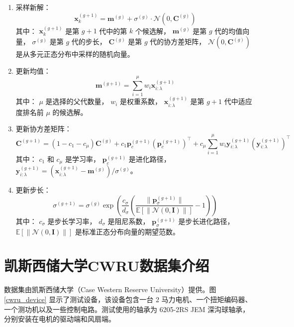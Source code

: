 \documentclass[master]{thesis-uestc}
\begin{document}
\begin{enumerate}[label={(\arabic*)}]
 \item 采样新解：
\begin{equation}
\mathbf{x}_k^{(g+1)} = \mathbf{m}^{(g)} + \sigma^{(g)} \cdot \mathcal{N}(0, \mathbf{C}^{(g)})
\label{eq:sample}
\end{equation}
其中：
    \(\mathbf{x}_k^{(g+1)}\) 是第 \(g+1\) 代中的第 \(k\) 个候选解，
    \(\mathbf{m}^{(g)}\) 是第 \(g\) 代的均值向量，
    \(\sigma^{(g)}\) 是第 \(g\) 代的步长，
    \(\mathbf{C}^{(g)}\) 是第 \(g\) 代的协方差矩阵，
    \(\mathcal{N}(0, \mathbf{C}^{(g)})\) 是从多元正态分布中采样的随机向量。

 \item 更新均值：
\begin{equation}
\mathbf{m}^{(g+1)} = \sum_{i=1}^{\mu} w_i \mathbf{x}_{i:\lambda}^{(g+1)}
\label{eq:mean_update}
\end{equation}
其中：
    \(\mu\) 是选择的父代数量，
    \(w_i\) 是权重系数，
    \(\mathbf{x}_{i:\lambda}^{(g+1)}\) 是第 \(g+1\) 代中适应度排名前 \(\mu\) 的候选解。

 \item 更新协方差矩阵：
\begin{equation}
\mathbf{C}^{(g+1)} = (1 - c_1 - c_\mu) \mathbf{C}^{(g)} + c_1 \mathbf{p}_c^{(g+1)} (\mathbf{p}_c^{(g+1)})^\top + c_\mu \sum_{i=1}^{\mu} w_i \mathbf{y}_{i:\lambda}^{(g+1)} (\mathbf{y}_{i:\lambda}^{(g+1)})^\top
\label{eq:covariance_update}
\end{equation}
其中：
    \(c_1\) 和 \(c_\mu\) 是学习率，
    \(\mathbf{p}_c^{(g+1)}\) 是进化路径，
    \(\mathbf{y}_{i:\lambda}^{(g+1)} = (\mathbf{x}_{i:\lambda}^{(g+1)} - \mathbf{m}^{(g)}) / \sigma^{(g)}\)。

 \item 更新步长：
\begin{equation}
\sigma^{(g+1)} = \sigma^{(g)} \exp\left(\frac{c_\sigma}{d_\sigma} \left(\frac{\|\mathbf{p}_\sigma^{(g+1)}\|}{\mathbb{E}[\|\mathcal{N}(0, \mathbf{I})\|]} - 1\right)\right)
\label{eq:stepsize_update}
\end{equation}
其中：
    \(c_\sigma\) 是步长学习率，
    \(d_\sigma\) 是阻尼系数，
    \(\mathbf{p}_\sigma^{(g+1)}\) 是步长进化路径，
    \(\mathbb{E}[\|\mathcal{N}(0, \mathbf{I})\|]\) 是标准正态分布向量的期望范数。
\end{enumerate}

\section{凯斯西储大学CWRU数据集介绍}
数据集由凯斯西储大学（Case Western Reserve University）提供。图 \ref{cwru_device} 显示了测试设备，该设备包含一台 2 马力电机、一个扭矩编码器、一个测功机以及一些控制电路。测试使用的轴承为 6205-2RS JEM 深沟球轴承，分别安装在电机的驱动端和风扇端。  
\end{document}
